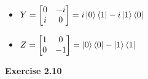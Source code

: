 \documentclass{article}
\begin{document}
\begin{framed}
\begin{itemize}
        \item $Y=\begin{bmatrix}0 & -i \\ i & 0\end{bmatrix} = i\ket{0}\bra{1} - i\ket{1}\bra{0}$ 
        \item $Z=\begin{bmatrix}1 & 0 \\ 0 & -1\end{bmatrix} = \ket{0}\bra{0} - \ket{1}\bra{1}$
    \end{itemize}
    
\end{framed}

\bigskip

\begin{framed}
    \noindent \textbf{Exercise 2.10}
    
    \medskip
    
    
\end{framed}

\bigskip
\end{document}
